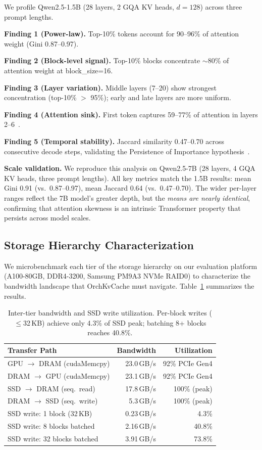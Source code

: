 \documentclass[conference]{IEEEtran}
\begin{document}
We profile Qwen2.5-1.5B (28 layers, 2 GQA KV heads, $d{=}128$) across three prompt lengths.


\textbf{Finding 1 (Power-law).} Top-10\% tokens account for 90--96\% of attention weight (Gini 0.87--0.97).

\textbf{Finding 2 (Block-level signal).} Top-10\% blocks concentrate ${\sim}$80\% of attention weight at block\_size=16.

\textbf{Finding 3 (Layer variation).} Middle layers (7--20) show strongest concentration (top-10\% $>$ 95\%); early and late layers are more uniform.

\textbf{Finding 4 (Attention sink).} First token captures 59--77\% of attention in layers 2--6~\cite{streamingllm}.

\textbf{Finding 5 (Temporal stability).} Jaccard similarity 0.47--0.70 across consecutive decode steps, validating the Persistence of Importance hypothesis~\cite{scissorhands}.

\textbf{Scale validation.} We reproduce this analysis on Qwen2.5-7B (28 layers, 4 GQA KV heads, three prompt lengths). All key metrics match the 1.5B results: mean Gini 0.91 (vs.\ 0.87--0.97), mean Jaccard 0.64 (vs.\ 0.47--0.70). The wider per-layer ranges reflect the 7B model's greater depth, but the \emph{means are nearly identical}, confirming that attention skewness is an intrinsic Transformer property that persists across model scales.

\subsection{Storage Hierarchy Characterization}
\label{sec:storage-char}

We microbenchmark each tier of the storage hierarchy on our evaluation platform (A100-80GB, DDR4-3200, Samsung PM9A3 NVMe RAID0) to characterize the bandwidth landscape that OrchKvCache must navigate. Table~\ref{tab:storage-char} summarizes the results.

\begin{table}[t]
\centering
\caption{Inter-tier bandwidth and SSD write utilization. Per-block writes ($\leq$32\,KB) achieve only 4.3\% of SSD peak; batching 8+ blocks reaches 40.8\%.}
\label{tab:storage-char}
\small
\begin{tabular}{@{}lrr@{}}
\toprule
Transfer Path & Bandwidth & Utilization \\
\midrule
GPU $\to$ DRAM (cudaMemcpy) & 23.0\,GB/s & 92\% PCIe Gen4 \\
DRAM $\to$ GPU (cudaMemcpy) & 23.1\,GB/s & 92\% PCIe Gen4 \\
SSD $\to$ DRAM (seq.\ read)  & 17.8\,GB/s & 100\% (peak) \\
DRAM $\to$ SSD (seq.\ write) & 5.3\,GB/s & 100\% (peak) \\
\midrule
SSD write: 1 block (32\,KB)  & 0.23\,GB/s & 4.3\% \\
SSD write: 8 blocks batched  & 2.16\,GB/s & 40.8\% \\
SSD write: 32 blocks batched & 3.91\,GB/s & 73.8\% \\
\bottomrule
\end{tabular}
\end{table}
\end{document}
